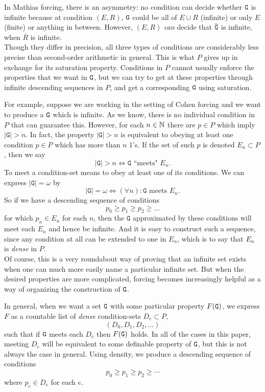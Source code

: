 \documentclass{amsart}
\begin{document}
	In Mathias forcing, there is an asymmetry: no condition can decide whether $\tt{G}$ is infinite because at condition $(E,R)$, $\tt{G}$ could be all of $E\cup R$ (infinite) or only $E$ (finite) or anything in between. However, $(E,R)$ \textit{can} decide that $\overline{\tt{G}}$ is infinite, when $\overline{R}$ is infinite.\\
	
	Though they differ in precision, all three types of conditions are considerably less precise than second-order arithmetic in general. This is what $P$ gives up in exchange for its saturation property. Conditions in $P$ cannot usually enforce the properties that we want in $\tt{G}$, but we can try to get at these properties through infinite descending sequences in $P$, and get a corresponding $\tt{G}$ using saturation.
	
	For example, suppose we are working in the setting of Cohen forcing and we want to produce a $\tt{G}$ which is infinite. As we know, there is no individual condition in $P$ that can guarantee this. However, for each $n\in\mathbb{N}$ there are $p\in P$ which imply $|\mathtt{G}|>n$. In fact, the property $|\mathtt{G}|>n$ is equivalent to obeying at least one condition $p\in P$ which has more than $n$ 1's. If the set of such $p$ is denoted $E_n\subset P$, then we say
	$$
	|\mathtt{G}|>n \iff \mathtt{G} \text{ ``meets" } E_n.
	$$
	To meet a condition-set means to obey at least one of its conditions. We can express $|\mathtt{G}|=\omega$ by
	$$
	|\mathtt{G}|=\omega  \iff (\forall n): \mathtt{G} \text{ meets } E_n.
	$$
	So if we have a descending sequence of conditions 
	$$
	p_0\geq p_1 \geq p_2 \geq \dots
	$$
	for which $p_n\in E_n$ for each $n$, then the $\mathtt{G}$ approximated by these conditions will meet each $E_n$ and hence be infinite. And it is easy to construct such a sequence, since any condition at all can be extended to one in $E_n$, which is to say that $E_n$ is \textit{dense} in $P$.\\
	
	Of course, this is a very roundabout way of proving that an infinite set exists when one can much more easily name a particular infinite set. But when the desired properties are more complicated, forcing becomes increasingly helpful as a way of organizing the construction of $\tt{G}$.
	
	In general, when we want a set $\tt{G}$ with some particular property $F(\tt{G})$, we express $F$ as a countable list of \textit{dense} condition-sets $D_e\subset P$,
	$$
	(D_0,D_1,D_2,\dots)
	$$
	such that if $\tt{G}$ meets each $D_e$ then $F(\tt{G})$ holds. In all of the cases in this paper, meeting $D_e$ will be equivalent to some definable property of $\tt{G}$, but this is not always the case in general. Using density, we produce a descending sequence of conditions
	$$
	p_0 \geq p_1 \geq p_2 \geq \cdots
	$$
	where $p_e\in D_e$ for each $e$. 
	
\end{document}
